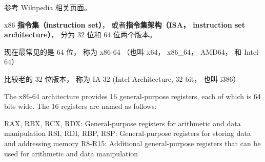 
\begin{issues}
\issueDraft
\end{issues}

参考 Wikipedia \href{https://en.wikipedia.org/wiki/X86-64}{相关页面}。

x86 \textbf{指令集（instruction set）}， 或者\textbf{指令集架构（ISA， instruction set architecture）}， 分为 32 位和 64 位两个版本。

现在最常见的是 64 位， 称为 x86-64 （也叫 x64， x86_64， AMD64， 和 Intel 64）

比较老的 32 位版本， 称为 IA-32 (Intel Architecture, 32-bit， 也叫 i386）


The x86-64 architecture provides 16 general-purpose registers, each of which is 64 bits wide. The 16 registers are named as follows:

RAX, RBX, RCX, RDX: General-purpose registers for arithmetic and data manipulation
RSI, RDI, RBP, RSP: General-purpose registers for storing data and addressing memory
R8-R15: Additional general-purpose registers that can be used for arithmetic and data manipulation